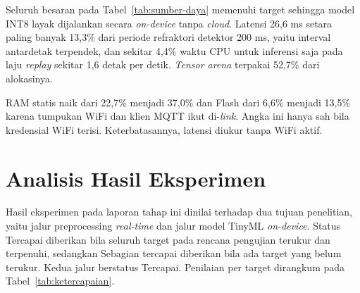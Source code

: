 
Seluruh besaran pada Tabel~\ref{tab:sumber-daya} memenuhi target sehingga model INT8 layak dijalankan secara \textit{on-device} tanpa \textit{cloud}. Latensi 26,6 ms setara paling banyak 13,3\% dari periode refraktori detektor 200 ms, yaitu interval antardetak terpendek, dan sekitar 4,4\% waktu CPU untuk inferensi saja pada laju \textit{replay} sekitar 1,6 detak per detik. \textit{Tensor arena} terpakai 52,7\% dari alokasinya.

RAM statis naik dari 22,7\% menjadi 37,0\% dan Flash dari 6,6\% menjadi 13,5\% karena tumpukan WiFi dan klien MQTT ikut di-\textit{link}. Angka ini hanya sah bila kredensial WiFi terisi. Keterbatasannya, latensi diukur tanpa WiFi aktif.

\section{Analisis Hasil Eksperimen}

Hasil eksperimen pada laporan tahap ini dinilai terhadap dua tujuan penelitian, yaitu jalur preprocessing \textit{real-time} dan jalur model TinyML \textit{on-device}. Status Tercapai diberikan bila seluruh target pada rencana pengujian terukur dan terpenuhi, sedangkan Sebagian tercapai diberikan bila ada target yang belum terukur. Kedua jalur berstatus Tercapai. Penilaian per target dirangkum pada Tabel~\ref{tab:ketercapaian}.

